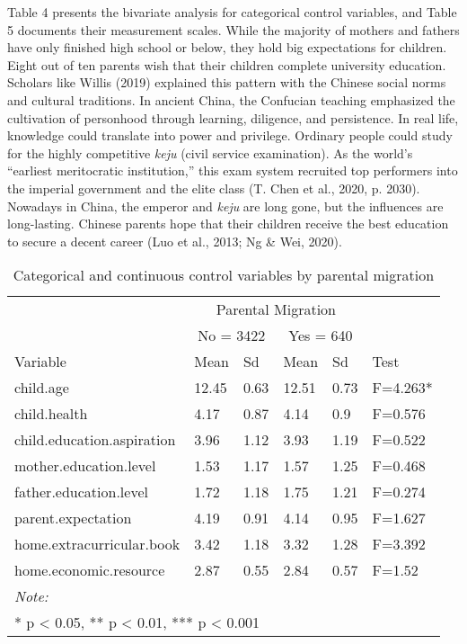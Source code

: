 \documentclass[
  man,floatsintext]{apa7}
\begin{document}
\newpage

Table 4 presents the bivariate analysis for categorical control variables, and Table 5 documents their measurement scales. While the majority of mothers and fathers have only finished high school or below, they hold big expectations for children. Eight out of ten parents wish that their children complete university education. Scholars like Willis (2019) explained this pattern with the Chinese social norms and cultural traditions. In ancient China, the Confucian teaching emphasized the cultivation of personhood through learning, diligence, and persistence. In real life, knowledge could translate into power and privilege. Ordinary people could study for the highly competitive \emph{keju} (civil service examination). As the world's ``earliest meritocratic institution,'' this exam system recruited top performers into the imperial government and the elite class (T. Chen et al., 2020, p. 2030). Nowadays in China, the emperor and \emph{keju} are long gone, but the influences are long-lasting. Chinese parents hope that their children receive the best education to secure a decent career (Luo et al., 2013; Ng \& Wei, 2020).

\begin{table}

\caption{\label{tab:unnamed-chunk-4}Categorical and continuous control variables by parental migration}
\centering
\begin{tabular}[t]{llllll}
\toprule
\multicolumn{1}{c}{ } & \multicolumn{4}{c}{Parental Migration} \\
\cmidrule(l{3pt}r{3pt}){2-5}
\multicolumn{1}{c}{ } & \multicolumn{2}{c}{No = 3422} & \multicolumn{2}{c}{Yes = 640} \\
\cmidrule(l{3pt}r{3pt}){2-3} \cmidrule(l{3pt}r{3pt}){4-5}
Variable & Mean & Sd & Mean & Sd & Test\\
\midrule
child.age & 12.45 & 0.63 & 12.51 & 0.73 & F=4.263*\\
child.health & 4.17 & 0.87 & 4.14 & 0.9 & F=0.576\\
child.education.aspiration & 3.96 & 1.12 & 3.93 & 1.19 & F=0.522\\
mother.education.level & 1.53 & 1.17 & 1.57 & 1.25 & F=0.468\\
father.education.level & 1.72 & 1.18 & 1.75 & 1.21 & F=0.274\\
\addlinespace
parent.expectation & 4.19 & 0.91 & 4.14 & 0.95 & F=1.627\\
home.extracurricular.book & 3.42 & 1.18 & 3.32 & 1.28 & F=3.392\\
home.economic.resource & 2.87 & 0.55 & 2.84 & 0.57 & F=1.52\\
\bottomrule
\multicolumn{6}{l}{\rule{0pt}{1em}\textit{Note: }}\\
\multicolumn{6}{l}{\rule{0pt}{1em}* p < 0.05, ** p < 0.01, *** p < 0.001}\\
\end{tabular}
\end{table}
\end{document}
